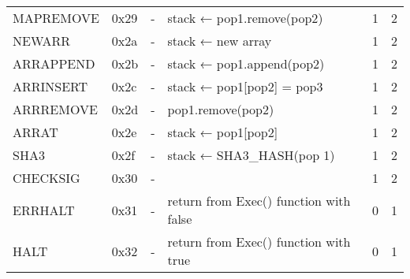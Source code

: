 \begin{longtable}[c]{L{2.5cm} L{1cm} L{3cm} L{5.5cm} R{0.8cm} R{1cm} }
MAPREMOVE & 0x29   & -                                                                                                        & stack ← pop1.remove(pop2)                                                                       & 1         & 2          \\
NEWARR    & 0x2a   & -                                                                                                        & stack ← new array                                                                                           & 1         & 2          \\
ARRAPPEND & 0x2b   & -                                                                                                        & stack ← pop1.append(pop2)                                                                            & 1         & 2          \\
ARRINSERT & 0x2c   & -                                                                                                        & stack ← pop1[pop2] = pop3                                                                                & 1         & 2          \\
ARRREMOVE & 0x2d   & -                                                                                                        & pop1.remove(pop2)                                                                                            & 1         & 2          \\
ARRAT     & 0x2e   & -                                                                                                        & stack ← pop1[pop2] & 1         & 2          \\
SHA3      & 0x2f   & -                                                                                                        & stack ← SHA3\_HASH(pop 1)                                                                                   & 1         & 2          \\
CHECKSIG  & 0x30   & -                                                                                                        &                                                                                                             & 1         & 2          \\
ERRHALT   & 0x31   & -                                                                                                        & return from Exec() function with false                                                                      & 0         & 1          \\
HALT      & 0x32   & -                                                                                                        & return from Exec() function with true                                                                       & 0         & 1          \\* \bottomrule
\end{longtable}